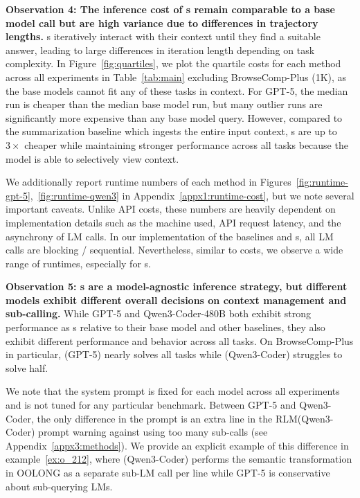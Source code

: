 \textbf{Observation 4: The inference cost of \RLM{}s remain comparable to a base model call but are high variance due to differences in trajectory lengths.} \RLM{}s iteratively interact with their context until they find a suitable answer, leading to large differences in iteration length depending on task complexity. In Figure~\ref{fig:quartiles}, we plot the quartile costs for each method across all experiments in Table~\ref{tab:main} excluding BrowseComp-Plus (1K), as the base models cannot fit any of these tasks in context. For GPT-5, the median \RLM{} run is cheaper than the median base model run, but many outlier \RLM{} runs are significantly more expensive than any base model query. However, compared to the summarization baseline which ingests the entire input context, \RLM{}s are up to $3\times$ cheaper while maintaining stronger performance across all tasks because the model is able to selectively view context. 

We additionally report runtime numbers of each method in Figures~\ref{fig:runtime-gpt-5},~\ref{fig:runtime-qwen3} in Appendix~\ref{appx1:runtime-cost}, but we note several important caveats. Unlike API costs, these numbers are heavily dependent on implementation details such as the machine used, API request latency, and the asynchrony of LM calls. In our implementation of the baselines and \RLM{}s, all LM calls are blocking / sequential. Nevertheless, similar to costs, we observe a wide range of runtimes, especially for \RLM{}s.

\textbf{Observation 5: \RLM{}s are a model-agnostic inference strategy, but different models exhibit different overall decisions on context management and sub-calling.} While GPT-5 and Qwen3-Coder-480B both exhibit strong performance as \RLM{}s relative to their base model and other baselines, they also exhibit different performance and behavior across all tasks. On BrowseComp-Plus in particular, \RLM(GPT-5) nearly solves all tasks while \RLM(Qwen3-Coder) struggles to solve half.

We note that the \RLM{} system prompt is fixed for each model across all experiments and is not tuned for any particular benchmark. Between GPT-5 and Qwen3-Coder, the only difference in the prompt is an extra line in the RLM(Qwen3-Coder) prompt warning against using too many sub-calls (see Appendix~\ref{appx3:methods}). We provide an explicit example of this difference in example~\ref{ex:o_212}, where \RLM{}(Qwen3-Coder) performs the semantic transformation in OOLONG as a separate sub-LM call per line while GPT-5 is conservative about sub-querying LMs.


